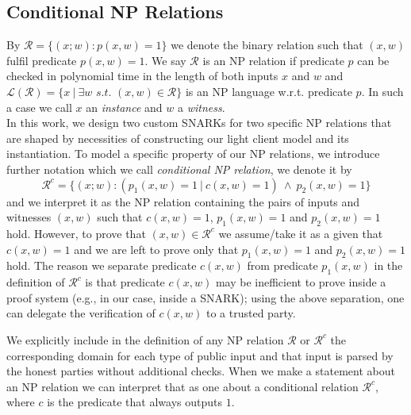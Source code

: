 \subsection{Conditional NP Relations}
\label{sec:conditional_relations}
\noindent By $\mathcal{R} =\{(x;w): p(x,w) = 1 \}$ we denote the binary relation such that $(x,w)$ 
fulfil predicate $p(x,w) = 1$. We say $\mathcal{R}$ is an NP relation if predicate $p$ can be checked in polynomial 
time in the length of both inputs $x$ and $w$ and $\mathcal{L}(\mathcal{R})= \{x \ | \ \exists w \textit{ s.t. } (x,w) \in \mathcal{R} \}$ 
is an NP language w.r.t. predicate $p$. In such a case we call $x$ an \emph{instance} and $w$ a \emph{witness}.  \\

\noindent  In this work, we design two custom SNARKs for two specific NP relations that are shaped by necessities of 
constructing our light client model and its instantiation. To model a specific property of our NP relations, we introduce further 
notation which we call \emph{conditional NP relation}, we denote it by 
$$\mathcal{R}^c = \{(x;w) : (p_1(x,w) =1 \ | \ c(x,w) =1) \ \wedge \ p_2(x,w) = 1 \}$$ and we interpret it as the NP relation containing the pairs of inputs and witnesses 
$(x,w)$ such that $c(x,w) =1$, $p_1(x,w) = 1$ and $p_2(x,w) =1$ hold. However, to prove that $(x,w) \in \mathcal{R}^c$ we assume/take it as a given that 
$c(x,w) =1$ and we are left to prove only that $p_1(x,w) = 1$ and $p_2(x,w) =1$ hold. The reason we separate predicate $c(x,w)$ from predicate $p_1(x,w)$ in the definition 
of $\mathcal{R}^c$ is that predicate $c(x,w)$ may be inefficient to prove inside a proof system (e.g., in our case, inside a SNARK); using the above separation, one can delegate  the verification of $c(x,w)$ to a trusted party.%

\noindent We explicitly include in the definition of any NP relation $\mathcal{R}$ or $\mathcal{R}^c$ the corresponding domain for each type 
of public input and that input is parsed by the honest parties without additional checks. 
When we make a statement about an NP relation we can interpret that as one about a conditional relation $\mathcal{R}^c$, where $c$ is the predicate that always outputs $1$.
\vspace{-0.07in}


